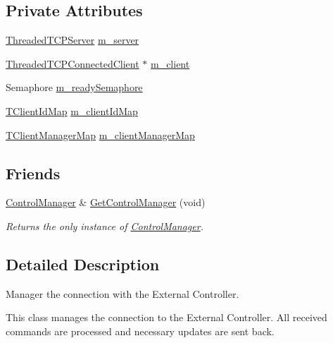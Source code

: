 \subsection*{Private Attributes}
\begin{DoxyCompactItemize}
\item 
\hyperlink{class_threaded_t_c_p_server}{Threaded\-T\-C\-P\-Server} \hyperlink{class_control_manager_a1b71eabaeddfd8ec80e503b734c72e9d}{m\-\_\-server}
\item 
\hyperlink{class_threaded_t_c_p_connected_client}{Threaded\-T\-C\-P\-Connected\-Client} $\ast$ \hyperlink{class_control_manager_a3081c331c70f5b08dc0ef2615d86cc55}{m\-\_\-client}
\item 
Semaphore \hyperlink{class_control_manager_ab718d2d17750dfea91411de871855075}{m\-\_\-ready\-Semaphore}
\item 
\hyperlink{class_control_manager_a5f6aa6ca619f6aa8dddfc3d5000162f0}{T\-Client\-Id\-Map} \hyperlink{class_control_manager_a5623f6ef4da21d143a7a6cf5fbee136f}{m\-\_\-client\-Id\-Map}
\item 
\hyperlink{class_control_manager_a27b18022695359e2a4d5563f91b6befd}{T\-Client\-Manager\-Map} \hyperlink{class_control_manager_af47dee5a077190c6aeb7b9ef3d9cfb3b}{m\-\_\-client\-Manager\-Map}
\end{DoxyCompactItemize}
\subsection*{Friends}
\begin{DoxyCompactItemize}
\item 
\hyperlink{class_control_manager}{Control\-Manager} \& \hyperlink{class_control_manager_a63bfd4667c9c70297f25ae5e5176818e}{Get\-Control\-Manager} (void)
\begin{DoxyCompactList}\small\item\em Returns the only instance of \hyperlink{class_control_manager}{Control\-Manager}. \end{DoxyCompactList}\end{DoxyCompactItemize}


\subsection{Detailed Description}
Manager the connection with the External Controller. 

This class manages the connection to the External Controller. All received commands are processed and necessary updates are sent back. 

